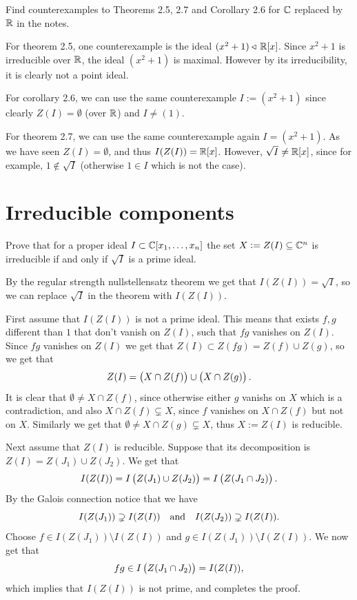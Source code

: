 \documentclass[11pt, a4paper]{article}
\begin{document}
\begin{exercise}
  Find counterexamples to Theorems 2.5, 2.7 and Corollary 2.6 for $\mathbb{C}$
  replaced by $\mathbb{R}$ in the notes.
\end{exercise}
\begin{solution}
  For theorem 2.5, one counterexample is the ideal $(x^2 + 1) \triangleleft\, \mathbb{R}[x]$.
  Since $x^2 + 1$ is irreducible over $\mathbb{R}$, the ideal $(x^2 + 1)$ is maximal.
  However by its irreducibility, it is clearly not a point ideal.

  For corollary 2.6, we can use the same counterexample $I := (x^2 + 1)$
  since clearly $Z(I) = \emptyset$ (over $\mathbb{R}$) and $I \neq (1)$.

  For theorem 2.7, we can use the same counterexample again $I = (x^2 + 1)$.
  As we have seen $Z(I) = \emptyset$, and thus $I(Z(I)) = \mathbb{R}[x]$.
  However, $\sqrt{I} \neq \mathbb{R}[x]$, since for example, $1 \notin \sqrt{I}$
  (otherwise $1 \in I$ which is not the case).
\end{solution}

\newpage

\section{Irreducible components}

\begin{exercise}
  Prove that for a proper ideal $I \subset \mathbb{C}[x_1,\dots,x_n]$ the set
  $X := Z(I) \subseteq \mathbb{C}^n$ is irreducible if and only if $\sqrt{I}$ is a prime
  ideal.
\end{exercise}
\begin{solution}
  By the regular strength nullstellensatz theorem we get that
  $I(Z(I)) = \sqrt{I}$, so we can replace $\sqrt{I}$ in the theorem
  with $I(Z(I))$.

  First assume that $I(Z(I))$ is not a prime ideal.
  This means that exists $f,g$ different than $1$ that don't vanish on $Z(I)$,
  such that $fg$ vanishes on $Z(I)$.
  Since $fg$ vanishes on $Z(I)$ we get that $Z(I) \subset Z(fg) = Z(f) \cup Z(g)$,
  so we get that
  \[
    Z(I) = \del{X \cap Z(f)} \cup \del{X \cap Z(g)}.
  \]
  It is clear that $\emptyset \neq X \cap Z(f)$,
  since otherwise either $g$ vanishs on $X$ which is a contradiction,
  and also $X \cap Z(f) \subsetneq X$,
  since $f$ vanishes on $X \cap Z(f)$ but not on $X$.
  Similarly we get that $\emptyset \neq X \cap Z(g) \subsetneq X$,
  thus $X := Z(I)$ is reducible.

  Next assume that $Z(I)$ is reducible.
  Suppose that its decomposition is $Z(I) = Z(J_1) \cup Z(J_2)$.
  We get that
  \[
    I(Z(I)) =
    I\del{Z(J_1) \cup Z(J_2)} =
    I\del{Z(J_1 \cap J_2)}.
  \]
  By the Galois connection notice that we have
  \[
    I(Z(J_1)) \supsetneq I(Z(I)) \quad \text{and} \quad
    I(Z(J_2)) \supsetneq I(Z(I)).
  \]
  Choose $f \in I(Z(J_1)) \setminus I(Z(I))$ and
  $g \in I(Z(J_1)) \setminus I(Z(I))$.
  We now get that
  \[
    fg \in I\del{Z(J_1 \cap J_2)} = I(Z(I)),
  \]
  which implies that $I(Z(I))$ is not prime, and completes the proof.
\end{solution}
\end{document}
